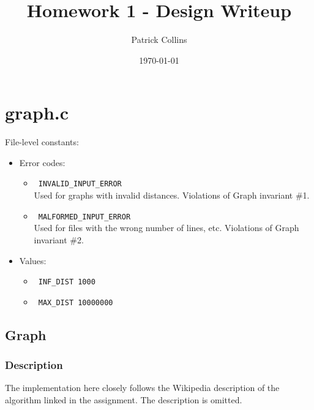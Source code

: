 \documentclass{article}
\newcommand{\field}[1]{\item \texttt{ #1 }}
\begin{document}
\title{Homework 1 - Design Writeup}
\author{Patrick Collins}
\date{\today}
\maketitle

\section{graph.c} 
File-level constants:
\begin{itemize}
\item Error codes:
  \begin{itemize}
  \field{INVALID\_INPUT\_ERROR}\\
    Used for graphs with invalid distances. Violations of Graph
    invariant \#1.
  \field{MALFORMED\_INPUT\_ERROR}\\
    Used for files with the wrong number of lines, etc. Violations of Graph
    invariant \#2. 
  \end{itemize}
\item Values:
  \begin{itemize}
  \field{INF\_DIST 1000}
  \field{MAX\_DIST 10000000}
  \end{itemize}
\end{itemize}

\subsection{Graph}

\subsubsection{Description}
The implementation here closely follows the Wikipedia description of
the algorithm linked in the assignment. The description is omitted.
\end{document}

